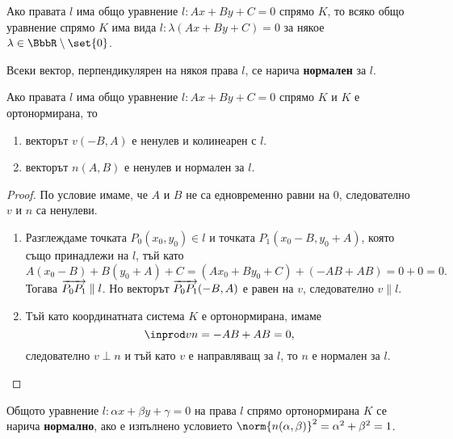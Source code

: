 \documentclass{../../common/topic}
\begin{document}
\begin{corollary}
  Ако правата \( l \) има общо уравнение \( l: Ax + By + C = 0 \) спрямо \( K \), то всяко общо уравнение спрямо \( K \) има вида \( l: \lambda(Ax + By + C) = 0 \) за някое \( \lambda \in \BbbR \setminus \set{ 0 } \).
\end{corollary}

\begin{definition}
  Всеки вектор, перпендикулярен на някоя права \( l \), се нарича \textbf{нормален} за \( l \).
\end{definition}

\begin{proposition}
  Ако правата \( l \) има общо уравнение \( l: Ax + By + C = 0 \) спрямо \( K \) и \( K \) е ортонормирана, то
  \begin{enumerate}
    \item векторът \( v(-B, A) \) е ненулев и колинеарен с \( l \).
    \item векторът \( n(A, B) \) е ненулев и нормален за \( l \).
  \end{enumerate}
\end{proposition}
\begin{proof}
  По условие имаме, че \( A \) и \( B \) не са едновременно равни на \( 0 \), следователно \( v \) и \( n \) са ненулеви.
  \begin{enumerate}
    \item Разглеждаме точката \( P_0(x_0, y_0) \in l \) и точката \( P_1(x_0 - B, y_0 + A) \), която също принадлежи на \( l \), тъй като
    \begin{equation*}
      A(x_0 - B) + B(y_0 + A) + C = (Ax_0 + By_0 + C) + (-AB + AB) = 0 + 0 = 0.
    \end{equation*}
     Тогава \( \overrightarrow{P_0 P_1} \parallel l \). Но векторът \( \overrightarrow{P_0 P_1}(-B, A) \) е равен на \( v \), следователно \( v \parallel l \).

    \item Тъй като координатната система \( K \) е ортонормирана, имаме
    \begin{equation*}
      \inprod v n = -AB + AB = 0,
    \end{equation*}
    следователно \( v \perp n \) и тъй като \( v \) е направляващ за \( l \), то \( n \) е нормален за \( l \).
  \end{enumerate}
\end{proof}

\begin{definition}
  Общото уравнение \( l: \alpha x + \beta y + \gamma = 0 \) на права \( l \) спрямо ортонормирана \( K \) се нарича \textbf{нормално}, ако е изпълнено условието \( \norm{n(\alpha, \beta)}^2 = \alpha^2 + \beta^2 = 1 \).
\end{definition}
\end{document}
